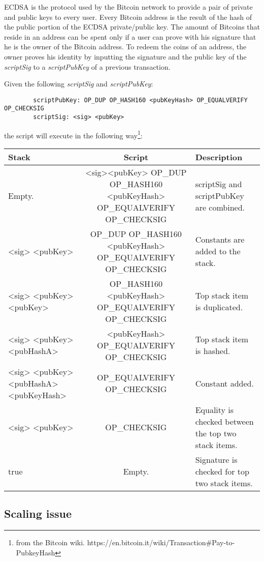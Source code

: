 		ECDSA is the protocol used by the Bitcoin network to provide a pair of private and public keys to every user. Every Bitcoin address is the result of the hash of the public portion of the ECDSA private/public key. The amount of Bitcoins that reside in an address can be spent only if a user can prove with his signature that he is the owner of the Bitcoin address. To redeem the coins of an address, the owner proves his identity by inputting the signature and the public key of the \textit{scriptSig} to a \textit{scriptPubKey} of a previous transaction.
		
		Given the following \textit{scriptSig} and \textit{scriptPubKey}:
		
		\begin{verbatim}
		scriptPubKey: OP_DUP OP_HASH160 <pubKeyHash> OP_EQUALVERIFY OP_CHECKSIG
		scriptSig: <sig> <pubKey>
		\end{verbatim}
		
		the script will execute in the following way\footnote{from the Bitcoin wiki. https://en.bitcoin.it/wiki/Transaction\#Pay-to-PubkeyHash}:
		\begin{center}
			\begin{tabulary}{\textwidth}{|L|C|L|}
			\hline
			\textbf{Stack} & \textbf{Script} & \textbf{Description} \\ \hline
			Empty. & <sig><pubKey> OP\_DUP OP\_HASH160 <pubKeyHash> OP\_EQUALVERIFY OP\_CHECKSIG & scriptSig and scriptPubKey are combined. \\ \hline
			<sig> <pubKey> & OP\_DUP OP\_HASH160 <pubKeyHash> OP\_EQUALVERIFY OP\_CHECKSIG & Constants are added to the stack. \\ \hline
			<sig> <pubKey> <pubKey> & OP\_HASH160 <pubKeyHash> OP\_EQUALVERIFY OP\_CHECKSIG & Top stack item is duplicated. \\ \hline
			<sig> <pubKey> <pubHashA> & <pubKeyHash> OP\_EQUALVERIFY OP\_CHECKSIG & Top stack item is hashed. \\ \hline
			<sig> <pubKey> <pubHashA> <pubKeyHash> & OP\_EQUALVERIFY OP\_CHECKSIG & Constant added. \\ \hline
			<sig> <pubKey> & OP\_CHECKSIG & Equality is checked between the top two stack items. \\ \hline
			true & Empty. & Signature is checked for top two stack items. \\
			\hline
			\end{tabulary}
		\end{center}
		
		\subsection{Scaling issue}
		
